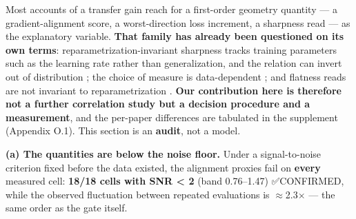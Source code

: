 \documentclass[pdflatex,sn-mathphys-ay]{sn-jnl}
\begin{document}
Most accounts of a transfer gain reach for a first-order geometry quantity --- a gradient-alignment score, a worst-direction loss increment, a sharpness read --- as the explanatory variable. \textbf{That family has already been questioned on its own terms}: reparametrization-invariant sharpness tracks training parameters such as the learning rate rather than generalization, and the relation can invert out of distribution \citep{andriushchenko2023}; the choice of measure is data-dependent \citep{dziugaite2020}; and flatness reads are not invariant to reparametrization \citep{dinh2017,kwon2021}. \textbf{Our contribution here is therefore not a further correlation study but a decision procedure and a measurement}, and the per-paper differences are tabulated in the supplement (Appendix O.1). This section is an \textbf{audit}, not a model.

\textbf{(a) The quantities are below the noise floor.} Under a signal-to-noise criterion fixed before the data existed, the alignment proxies fail on \textbf{every} measured cell: \textbf{18/18 cells with SNR \textless{} 2} (band 0.76--1.47) ✅CONFIRMED, while the observed fluctuation between repeated evaluations is \ensuremath{\approx}2.3\ensuremath{\times} --- the same order as the gate itself.
\end{document}
